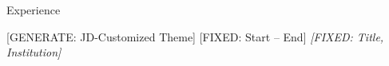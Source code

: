 \documentclass{resume}
\begin{document}
\vspace{-0.15cm}


\begin{rSection}{Experience}

\begin{rSubsection}{[GENERATE: JD-Customized Theme]}%
                   {\textcolor{black!60}{[FIXED: Start -- End]}}%
                   {\em [FIXED: Title, Institution]}{}
\item [GENERATE: Bullet 1 -- strongest JD-relevant accomplishment]
\end{rSubsection}

\end{rSection}

\vspace{-0.15cm}

\end{document}
